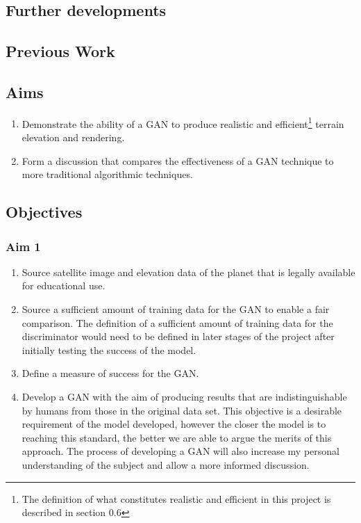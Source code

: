 \documentclass[a4paper]{report}
\begin{document}
\subsection{Further developments}
\appendix
\renewcommand\bibname{References}


\begin{appendices}
\section{Previous Work}
\subsection{Aims}
\begin{enumerate}
    \item Demonstrate the ability of a GAN to produce realistic and efficient\footnote{The definition of what constitutes realistic and efficient in this project is described in section 0.6} terrain elevation and rendering.
    \item Form a discussion that compares the effectiveness of a GAN technique to more traditional algorithmic techniques.
\end{enumerate}
\subsection{Objectives}
\subsubsection{Aim 1}
\begin{enumerate}
\renewcommand{\theenumi}{\alph{enumi}}
    \item Source satellite image and elevation data of the planet that is legally available for educational use.
    \item Source a sufficient amount of training data for the GAN to enable a fair comparison. The definition of a sufficient amount of training data for the discriminator would need to be defined in later stages of the project after initially testing the success of the model.
    \item Define a measure of success for the GAN.
    \item Develop a GAN with the aim of producing results that are indistinguishable by humans from those in the original data set. This objective is a desirable requirement of the model developed, however the closer the model is to reaching this standard, the better we are able to argue the merits of this approach. The process of developing a GAN will also increase my personal understanding of the subject and allow a more informed discussion.
\end{enumerate}

\end{appendices}
\end{document}
